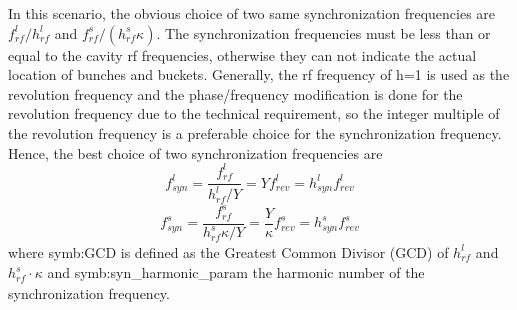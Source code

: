 

In this scenario, the obvious choice of two same synchronization frequencies are $f_{\mathit{rf}}^{l}/h^l_\mathit{rf} $ and $f_{\mathit{rf}}^{s}/(h^s_\mathit{rf}\kappa)$. The synchronization frequencies must be less than or equal to the cavity rf frequencies, otherwise they can not indicate the actual location of bunches and buckets. Generally, the rf frequency of h=1 is used as the revolution frequency and the phase/frequency modification is done for the revolution frequency due to the technical requirement, so the integer multiple of the revolution frequency is a preferable choice for the synchronization frequency. Hence, the best choice of two synchronization frequencies are 
\begin{equation}
f_{\mathit{syn}}^{l}=\frac{f_{\mathit{rf}}^{l}}{h^l_\mathit{rf}/Y}=Yf_{\mathit{rev}}^{l}=h_\mathit{syn}^\mathit{l}f_{\mathit{rev}}^{l} \label{synch_freq1}
\end{equation}
\begin{equation}
f_{\mathit{syn}}^{s}=\frac{f_{\mathit{rf}}^{s}}{h^s_\mathit{rf}\kappa/Y}=\frac{Y}{\kappa}f_{\mathit{rev}}^{s}=h_\mathit{syn}^\mathit{s}f_{\mathit{rev}}^{s} \label{synch_freq2}
\end{equation}
where \gls{symb:GCD} is defined as the Greatest Common Divisor (\gls{GCD}) of $h^l_\mathit{rf}$ and $h^s_\mathit{rf} \cdot \kappa$ and \gls{symb:syn_harmonic_param} the harmonic number of the synchronization frequency.

